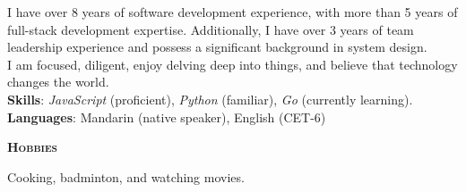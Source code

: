 \documentclass[a4paper]{article}
\newenvironment{changemargin}[2]{%
  \begin{list}{}{%
    \setlength{\topsep}{0pt}%
    \setlength{\leftmargin}{#1}%
    \setlength{\rightmargin}{#2}%
    \setlength{\listparindent}{\parindent}%
    \setlength{\itemindent}{\parindent}%
    \setlength{\parsep}{\parskip}%
  }%
  \item[]}{\end{list}
}
\newcommand{\lineover}{
	\begin{changemargin}{-0.05in}{-0.05in}
		\vspace*{-8pt}
		\hrulefill \\
		\vspace*{-2pt}
	\end{changemargin}
}
\newcommand{\header}[1]{
	\begin{changemargin}{-0.5in}{-0.5in}
		\scshape{\textbf{#1}}\\
	\end{changemargin}
}
\newenvironment{body} {
	\vspace*{-16pt}
	\begin{changemargin}{-0.5in}{-0.5in}
  }
	{\end{changemargin}
}
\begin{document}
\begin{body}
	\vspace{14pt}
	I have over 8 years of software development experience, with more than 5 years of full-stack development expertise. Additionally, I have over 3 years of team leadership experience and possess a significant background in system design.\\
	I am focused, diligent, enjoy delving deep into things, and believe that technology changes the world.\\
	\textbf{Skills}: \emph{JavaScript} (proficient), \emph{Python} (familiar), \emph{Go} (currently learning). \\
	\textbf{Languages}: Mandarin {(native speaker)}, English {(CET-6)}\\
\end{body}

\medskip


\header{Hobbies}

\begin{body}
	\vspace{14pt}
	Cooking, badminton, and watching movies.\\
\end{body}
\end{document}
